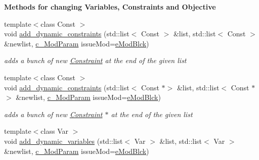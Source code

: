 \begin{Indent}\textbf{ Methods for changing Variables, Constraints and Objective}\par
\begin{DoxyCompactItemize}
\item 
{\footnotesize template$<$class Const $>$ }\\void \mbox{\hyperlink{class_s_m_spp__di__unipi__it_1_1_block_ac62b923907f97affc9460832240072fb}{add\+\_\+dynamic\+\_\+constraints}} (std\+::list$<$ Const $>$ \&list, std\+::list$<$ Const $>$ \&newlist, \mbox{\hyperlink{group___modification___t_y_p_e_s_ga544246d8c462e9a2d817c2c30797968f}{c\+\_\+\+Mod\+Param}} issue\+Mod=\mbox{\hyperlink{group___modification___t_y_p_e_s_gga48fddcdd03a03f49b7e389ca1ed938d4a21b14b26b1c0093a0905f6fc010bad29}{e\+Mod\+Blck}})
\begin{DoxyCompactList}\small\item\em adds a bunch of new \mbox{\hyperlink{class_s_m_spp__di__unipi__it_1_1_constraint}{Constraint}} at the end of the given list \end{DoxyCompactList}\item 
{\footnotesize template$<$class Const $>$ }\\void \mbox{\hyperlink{class_s_m_spp__di__unipi__it_1_1_block_a3fabbed976e93330b7f4af1bfb467670}{add\+\_\+dynamic\+\_\+constraints}} (std\+::list$<$ Const $\ast$$>$ \&list, std\+::list$<$ Const $\ast$$>$ \&newlist, \mbox{\hyperlink{group___modification___t_y_p_e_s_ga544246d8c462e9a2d817c2c30797968f}{c\+\_\+\+Mod\+Param}} issue\+Mod=\mbox{\hyperlink{group___modification___t_y_p_e_s_gga48fddcdd03a03f49b7e389ca1ed938d4a21b14b26b1c0093a0905f6fc010bad29}{e\+Mod\+Blck}})
\begin{DoxyCompactList}\small\item\em adds a bunch of new \mbox{\hyperlink{class_s_m_spp__di__unipi__it_1_1_constraint}{Constraint}} $\ast$ at the end of the given list \end{DoxyCompactList}\item 
{\footnotesize template$<$class Var $>$ }\\void \mbox{\hyperlink{class_s_m_spp__di__unipi__it_1_1_block_ae04d4ed8bfdbc7065d5296740dd0952b}{add\+\_\+dynamic\+\_\+variables}} (std\+::list$<$ Var $>$ \&list, std\+::list$<$ Var $>$ \&newlist, \mbox{\hyperlink{group___modification___t_y_p_e_s_ga544246d8c462e9a2d817c2c30797968f}{c\+\_\+\+Mod\+Param}} issue\+Mod=\mbox{\hyperlink{group___modification___t_y_p_e_s_gga48fddcdd03a03f49b7e389ca1ed938d4a21b14b26b1c0093a0905f6fc010bad29}{e\+Mod\+Blck}})

\end{DoxyCompactItemize}
\end{Indent}
